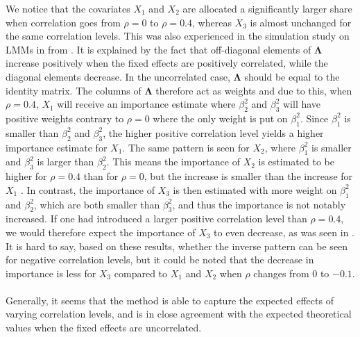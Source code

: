We notice that the covariates $X_1$ and $X_2$ are allocated a significantly larger share when correlation goes from $\rho=0$ to $\rho=0.4$, whereas $X_3$ is almost unchanged for the same correlation levels. This was also experienced in the simulation study on LMMs in  from \citet{Arnstad:Relative_variable_importance_in_Bayesian_linear_mixed_models:2024}. It is explained by the fact that off-diagonal elements of $\boldsymbol{\Lambda}$ increase positively when the fixed effects are positively correlated, while the diagonal elements decrease. In the uncorrelated case, $\boldsymbol{\Lambda}$ should be equal to the identity matrix. The columns of $\boldsymbol{\Lambda}$ therefore act as weights and due to this, when $\rho=0.4$, $X_1$ will receive an importance estimate where $\beta_2^2$ and $\beta_3^2$ will have positive weights contrary to $\rho=0$ where the only weight is put on $\beta_1^2$. Since $\beta_1^2$ is smaller than $\beta_2^2$ and $\beta_3^2$, the higher positive correlation level yields a higher importance estimate for $X_1$. The same pattern is seen for $X_2$, where $\beta_1^2$ is smaller and $\beta_3^2$ is larger than $\beta_2^2$. This means the importance of $X_2$ is estimated to be higher for $\rho=0.4$ than for $\rho=0$, but the increase is smaller than the increase for $X_1$ \citep{Arnstad:Relative_variable_importance_in_Bayesian_linear_mixed_models:2024}. In contrast, the importance of $X_3$ is then estimated with more weight on $\beta_1^2$ and $\beta_2^2$, which are both smaller than $\beta_3^2$, and thus the importance is not notably increased. If one had introduced a larger positive correlation level than $\rho=0.4$, we would therefore expect the importance of $X_3$ to even decrease, as was seen in \citet{Arnstad:Relative_variable_importance_in_Bayesian_linear_mixed_models:2024}. It is hard to say, based on these results, whether the inverse pattern can be seen for negative correlation levels, but it could be noted that the decrease in importance is less for $X_3$ compared to $X_1$ and $X_2$ when $\rho$ changes from $0$ to $-0.1$.
\\
\\
Generally, it seems that the method is able to capture the expected effects of varying correlation levels, and is in close agreement with the expected theoretical values when the fixed effects are uncorrelated.

